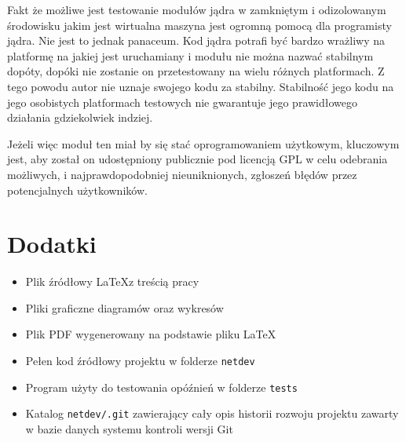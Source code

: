 \documentclass[11pt]{scrartcl}
\let\stdsection\section
\renewcommand\section{\newpage\stdsection}
\begin{document}
Fakt że możliwe jest testowanie modułów jądra w zamkniętym i odizolowanym środowisku jakim jest wirtualna maszyna jest ogromną pomocą dla programisty jądra. Nie jest to jednak panaceum. Kod jądra potrafi być bardzo wrażliwy na platformę na jakiej jest uruchamiany i modułu nie można nazwać stabilnym dopóty, dopóki nie zostanie on przetestowany na wielu różnych platformach. Z tego powodu autor nie uznaje swojego kodu za stabilny. Stabilność jego kodu na jego osobistych platformach testowych nie gwarantuje jego prawidłowego działania gdziekolwiek indziej.

Jeżeli więc moduł ten miał by się stać oprogramowaniem użytkowym, kluczowym jest, aby został on udostępniony publicznie pod licencją GPL w celu odebrania możliwych, i najprawdopodobniej nieuniknionych, zgłoszeń błędów przez potencjalnych użytkowników.

\section{Dodatki}

\begin{itemize}
\itemsep1pt\parskip0pt
\item
  Plik źródłowy \LaTeX  z treścią pracy
\item
  Pliki graficzne diagramów oraz wykresów
\item
  Plik PDF wygenerowany na podstawie pliku \LaTeX
\item
  Pełen kod źródłowy projektu w folderze \texttt{netdev}
\item
  Program użyty do testowania opóźnień w folderze \texttt{tests}
\item
  Katalog \texttt{netdev/.git} zawierający cały opis historii rozwoju projektu
  zawarty w bazie danych systemu kontroli wersji Git
\end{itemize}
\end{document}
